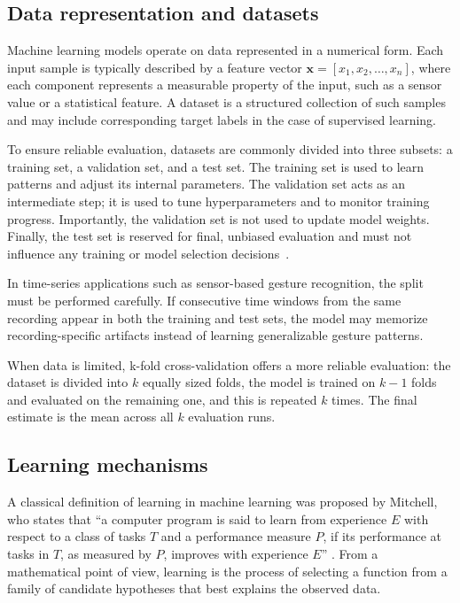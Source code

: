 \subsection{Data representation and datasets}
Machine learning models operate on data represented in a numerical form. Each input sample is typically described by a feature vector $\mathbf{x} = [x_1, x_2, \ldots, x_n]$, where each component represents a measurable property of the input, such as a sensor value or a statistical feature. A dataset is a structured collection of such samples and may include corresponding target labels in the case of supervised learning.

To ensure reliable evaluation, datasets are commonly divided into three subsets: a training set, a validation set, and a test set. The training set is used to learn patterns and adjust its internal parameters. The validation set acts as an intermediate step; it is used to tune hyperparameters and to monitor training progress. Importantly, the validation set is not used to update model weights. Finally, the test set is reserved for final, unbiased evaluation and must not influence any training or model selection decisions~\cite{bishop2006prml}.

In time-series applications such as sensor-based gesture recognition, the split must be performed carefully. If consecutive time windows from the same recording appear in both the training and test sets, the model may memorize recording-specific artifacts instead of learning generalizable gesture patterns. 

When data is limited, k-fold cross-validation offers a more reliable evaluation: the dataset is divided into $k$ equally sized folds, the model is trained on $k-1$ folds and evaluated on the remaining one, and this is repeated $k$ times. The final estimate is the mean across all $k$ evaluation runs.

\subsection{Learning mechanisms}
A classical definition of learning in machine learning was proposed by Mitchell, who states that “a computer program is said to learn from experience $E$ with respect to a class of tasks $T$ and a performance measure $P$, if its performance at tasks in $T$, as measured by $P$, improves with experience $E$” \cite{mitchell1997ml}. From a mathematical point of view, learning is the process of selecting a function from a family of candidate hypotheses that best explains the observed data. 


